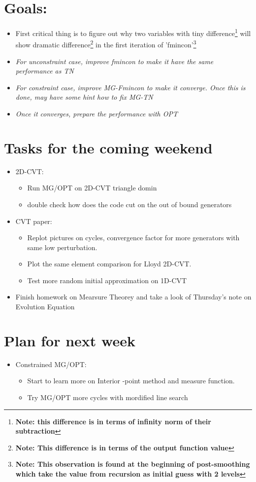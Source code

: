 \documentclass[10pt]{article}
\begin{document}
\section {Goals:}
\begin{itemize}
\item First critical thing is to figure out why two variables with tiny difference\footnote{\bf Note: this difference is in terms of infinity norm of their subtraction} will show dramatic difference\footnote{\bf Note: This difference is in terms of the output function value} in the first iteration of 'fmincon'\footnote{\bf Note: This observation is found at the beginning of post-smoothing which take the value from recursion as initial guess with 2 levels} 
\item{\em For unconstraint case, improve fmincon to make it have the same performance as TN}
\item{\em For constraint case, improve MG-Fmincon to make it converge. Once this is done, may have some hint how to fix MG-TN}
\item{\em Once it converges, prepare the performance with OPT}
\end{itemize}

\section{Tasks for the coming  weekend}
\begin{itemize}
\item 2D-CVT:
\begin{itemize}
\item Run MG/OPT on 2D-CVT triangle domin
\item double check how does the code cut on the out of bound generators
\end{itemize}
\item CVT paper:
\begin{itemize}
\item Replot pictures on cycles, convergence factor for more generators with same low perturbation.
\item Plot the same element comparison for Lloyd 2D-CVT.
\item Test more random initial approximation on 1D-CVT
\end{itemize}
\item Finish homework on Mearsure Theorey and take a look of Thursday's note on Evolution Equation
\end{itemize}

\section{Plan for next week}
\begin{itemize}
\item Constrained MG/OPT:
\begin{itemize}
\item Start to learn more on Interior -point method and measure function.
\item Try MG/OPT more cycles with mordified line search
\end{itemize}
\end{itemize}
\end{document}
